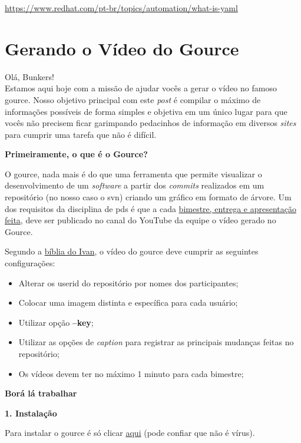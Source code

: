 \noindent\href{https://www.redhat.com/pt-br/topics/automation/what-is-yaml}{https://www.redhat.com/pt-br/topics/automation/what-is-yaml}

\section{Gerando o Vídeo do Gource}
Olá, Bunkers!\\
Estamos aqui hoje com a missão de ajudar vocês a gerar o vídeo no famoso \gls{gource}. Nosso objetivo principal com este \textit{post} é compilar o máximo de informações possíveis de forma simples e objetiva em um único lugar para que vocês não precisem ficar garimpando pedacinhos de informação em diversos \textit{sites} para cumprir uma tarefa que não é difícil.

\textbf{Primeiramente, o que é o Gource?}

O \gls{gource}, nada mais é do que uma ferramenta que permite visualizar o desenvolvimento de um \textit{software} a partir dos \textit{commits} realizados em um repositório (no nosso caso o \acs{svn}) criando um gráfico em formato de árvore.
Um dos requisitos da disciplina de \acs{pds} é que a cada \underline{bimestre, entrega e apresentação feita}, deve ser publicado no canal do YouTube da equipe o vídeo gerado no Gource. 

Segundo a \href{https://dicas.ivanfm.com/programacao/scm/controle-de-versao/gource.html}{bíblia do Ivan}, o vídeo do \gls{gource} deve cumprir as seguintes configurações:
\begin{itemize}
    \item Alterar os userid do repositório por nomes dos participantes;
    \item Colocar uma imagem distinta e específica para cada usuário;
    \item Utilizar opção \textbf{–key};
    \item Utilizar as opções de \textit{caption} para registrar as principais mudanças feitas no repositório;
    \item Os vídeos devem ter no máximo 1 minuto para cada bimestre; 
\end{itemize}

\textbf{Borá lá trabalhar}

\textbf{1. Instalação}

Para instalar o \gls{gource} é só clicar \href{https://github.com/acaudwell/Gource/releases/download/gource-0.47/gource-0.47.win64-setup.exe}{aqui} (pode confiar que não é vírus).

